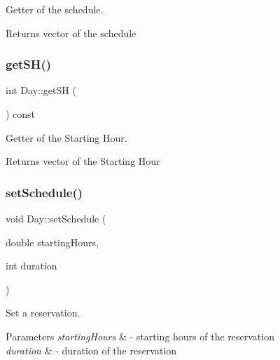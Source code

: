 Getter of the schedule. 

\begin{DoxyReturn}{Returns}
vector of the schedule 
\end{DoxyReturn}
\mbox{\label{class_day_ab730d15c19486aa3c45839e8f5990c57}} 
\subsubsection{\texorpdfstring{get\+S\+H()}{getSH()}}
{\footnotesize\ttfamily int Day\+::get\+SH (\begin{DoxyParamCaption}{ }\end{DoxyParamCaption}) const}



Getter of the Starting Hour. 

\begin{DoxyReturn}{Returns}
vector of the Starting Hour 
\end{DoxyReturn}
\mbox{\label{class_day_ad3c8ca8c171a994c59788965166ae36b}} 
\subsubsection{\texorpdfstring{set\+Schedule()}{setSchedule()}\hspace{0.1cm}{\footnotesize\ttfamily [1/2]}}
{\footnotesize\ttfamily void Day\+::set\+Schedule (\begin{DoxyParamCaption}\item[{double}]{starting\+Hours,  }\item[{int}]{duration }\end{DoxyParamCaption})}



Set a reservation. 


\begin{DoxyParams}{Parameters}
{\em starting\+Hours} & -\/ starting hours of the reservation \\
\hline
{\em duration} & -\/ duration of the reservation \\
\hline
\end{DoxyParams}
\mbox{\label{class_day_aa46e0811bd26355979c6cf9f4e4b9df7}} 
